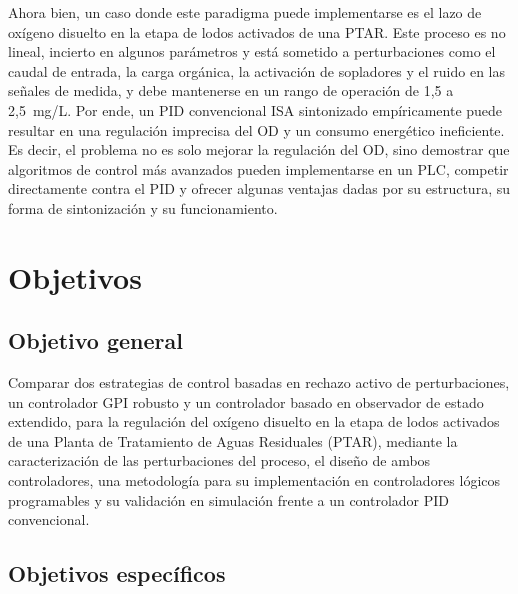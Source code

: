 Ahora bien, un caso donde este paradigma puede implementarse es el lazo de
oxígeno disuelto en la etapa de lodos activados de una PTAR. Este proceso es
no lineal, incierto en algunos parámetros y está sometido a perturbaciones como el caudal de entrada, la carga
orgánica, la activación de sopladores y el ruido en las señales de medida, y
debe mantenerse en un rango de operación de 1,5 a 2,5~mg/L. Por ende, un PID
convencional ISA sintonizado empíricamente puede resultar en una regulación
imprecisa del OD y un consumo energético
ineficiente.  Es
decir, el problema no es solo mejorar la regulación del OD, sino demostrar que
algoritmos de control más avanzados pueden implementarse en un PLC, competir
directamente contra el PID y ofrecer algunas ventajas dadas por su estructura,
su forma de sintonización y su funcionamiento.


\section{Objetivos}
\label{sec:objetivos}

\subsection{Objetivo general}

Comparar dos estrategias de control basadas en rechazo activo de perturbaciones, un controlador GPI
robusto y un controlador basado en observador de estado extendido, para la regulación del oxígeno
disuelto en la etapa de lodos activados de una Planta de Tratamiento de Aguas Residuales (PTAR),
mediante la caracterización de las perturbaciones del proceso, el diseño de ambos controladores, una
metodología para su implementación en controladores lógicos programables y su validación en
simulación frente a un controlador PID convencional.

\subsection{Objetivos específicos}

